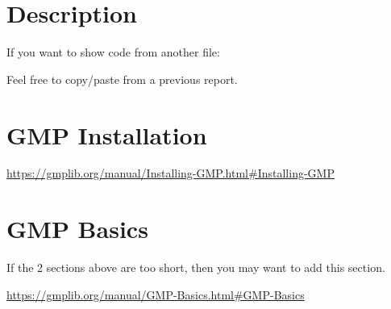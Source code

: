 \section{\cry{} Description}

If you want to show code from another file:
\codes{}

Feel free to copy/paste from a previous report.


\section{GMP Installation}

\url{https://gmplib.org/manual/Installing-GMP.html#Installing-GMP}


\section{GMP Basics}

If the 2 sections above are too short,
then you may want to add this section.

\url{https://gmplib.org/manual/GMP-Basics.html#GMP-Basics}
